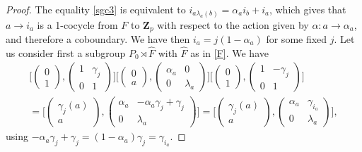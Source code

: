 \documentclass[10pt,a4paper]{amsart}
\newcommand{\Z}{\mathbf Z}
\begin{document}
\begin{proof}
 The equality \eqref{sgc3} is equivalent to $i_{a\lambda_a(b)}=\alpha_a i_b+i_a$, which gives that $a \to i_a$ is a 1-cocycle from $F$ to $\Z_p$ with respect to the action given by $\alpha\colon a\to\alpha_a$, and therefore
 a coboundary. We have then $i_a=j(1-\alpha_a)$ for some fixed $j$. Let us consider first a subgroup $P_0\rtimes \hat F$ with $\hat F$ as in \eqref{F}. We have
		$$\begin{array}{l}
		\Big[\begin{pmatrix}
		0\\
		1
		\end{pmatrix},\begin{pmatrix}
		1 & \gamma_j\\
		0&1
		\end{pmatrix}\Big]\Big[\begin{pmatrix}
		0\\
		a
		\end{pmatrix},\begin{pmatrix}
		\alpha_a & 0\\
		0&\lambda_a
		\end{pmatrix}\Big]
\Big[\begin{pmatrix}
		0\\
		1
		\end{pmatrix},\begin{pmatrix}
		1 & -\gamma_j\\
		0&1
		\end{pmatrix}\Big]\\[12pt]
=\Big[\begin{pmatrix}
		\gamma_j(a)\\
		a
		\end{pmatrix},\begin{pmatrix}
		\alpha_a & -\alpha_a\gamma_j+\gamma_j\\
		0&\lambda_a
		\end{pmatrix}\Big]
=\Big[\begin{pmatrix}
		\gamma_j(a)\\
		a
		\end{pmatrix},\begin{pmatrix}
		\alpha_a & \gamma_{i_a}\\
		0&\lambda_a
		\end{pmatrix}\Big],
\end{array}
		$$
using $-\alpha_a\gamma_j+\gamma_j=(1-\alpha_a)\gamma_j=\gamma_{i_a}$.


\end{proof}
\end{document}
